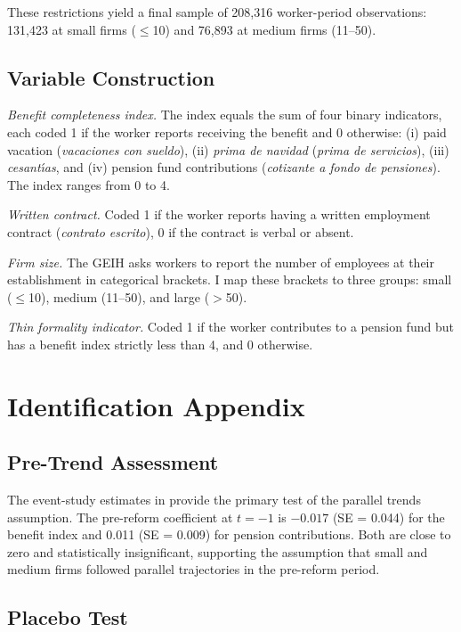 \documentclass[12pt]{article}
\begin{document}
These restrictions yield a final sample of 208,316 worker-period observations: 131,423 at small firms ($\leq$10) and 76,893 at medium firms (11--50).

\subsection{Variable Construction}

\textit{Benefit completeness index.} The index equals the sum of four binary indicators, each coded 1 if the worker reports receiving the benefit and 0 otherwise: (i) paid vacation (\textit{vacaciones con sueldo}), (ii) \textit{prima de navidad} (\textit{prima de servicios}), (iii) \textit{cesant\'{\i}as}, and (iv) pension fund contributions (\textit{cotizante a fondo de pensiones}). The index ranges from 0 to 4.

\textit{Written contract.} Coded 1 if the worker reports having a written employment contract (\textit{contrato escrito}), 0 if the contract is verbal or absent.

\textit{Firm size.} The GEIH asks workers to report the number of employees at their establishment in categorical brackets. I map these brackets to three groups: small ($\leq$10), medium (11--50), and large ($>$50).

\textit{Thin formality indicator.} Coded 1 if the worker contributes to a pension fund but has a benefit index strictly less than 4, and 0 otherwise.

\section{Identification Appendix}
\label{app:identification}

\subsection{Pre-Trend Assessment}

The event-study estimates in  provide the primary test of the parallel trends assumption. The pre-reform coefficient at $t = -1$ is $-0.017$ (SE = 0.044) for the benefit index and 0.011 (SE = 0.009) for pension contributions. Both are close to zero and statistically insignificant, supporting the assumption that small and medium firms followed parallel trajectories in the pre-reform period.

\subsection{Placebo Test}
\end{document}
